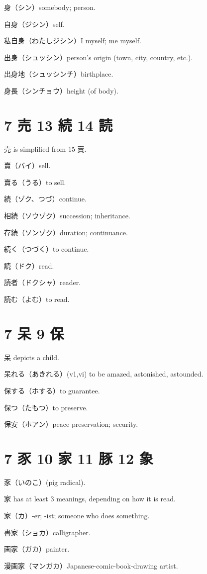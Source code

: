身（シン）somebody; person.

自身（ジシン）self.

私自身（わたしジシン）I myself; me myself.

出身（シュッシン）person's origin (town, city, country, etc.).

出身地（シュッシンチ）birthplace.

身長（シンチョウ）height (of body).

\section{7 売 13 続 14 読}

売 is simplified from 15 賣.

賣（バイ）sell.

賣る（うる）to sell.

続（ゾク、つづ）continue.

相続（ソウゾク）succession; inheritance.

存続（ソンゾク）duration; continuance.

続く（つづく）to continue.

読（ドク）read.

読者（ドクシャ）reader.

読む（よむ）to read.

\section{7 呆 9 保}

呆 depicts a child.

呆れる（あきれる）(v1,vi) to be amazed, astonished, astounded.

保する（ホする）to guarantee.

保つ（たもつ）to preserve.

保安（ホアン）peace preservation; security.

\section{7 豕 10 家 11 豚 12 象}

豕（いのこ）(pig radical).

家 has at least 3 meanings, depending on how it is read.

家（カ）-er; -ist; someone who does something.

書家（ショカ）calligrapher.

画家（ガカ）painter.

漫画家（マンガカ）Japanese-comic-book-drawing artist.


